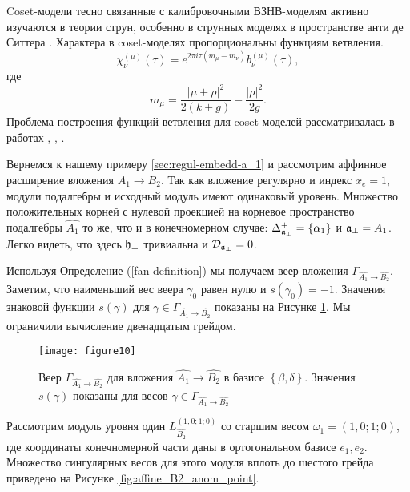 Coset-модели \cite{Goddard198588} тесно связанные с калибровочными ВЗНВ-моделям активно изучаются в теории струн, особенно в струнных моделях в пространстве анти де Ситтера
\cite{Maldacena:2000hw,Maldacena:2000kv,Maldacena:2001km,Maldacena:2001ky,Aharony:1999ti}. Характера в coset-моделях пропорциональны функциям ветвления.
\begin{equation}
  \label{eq:31}
  \chi^{(\mu)}_{\nu}(\tau)=e^{2\pi i \tau (m_{\mu}-m_{\nu})} b^{(\mu)}_{\nu}(\tau),
\end{equation}
где
\begin{equation*}
  \label{eq:46}
  m_{\mu}=\frac{\left|\mu+\rho\right|^2}{2(k+g)}-\frac{\left|\rho\right|^2}{2g}.
\end{equation*}
Проблема построения функций ветвления для  coset-моделей рассматривалась в работах  \cite{Dunbar:1992gh}, \cite{Hwang:1994yr}, \cite{lu1994branching}.

Вернемся к нашему примеру \ref{sec:regul-embedd-a_1} и рассмотрим аффинное расширение вложения $A_1 \rightarrow B_2$. Так как вложение регулярно и индекс $x_e=1$, модули подалгебры и исходный модуль имеют одинаковый уровень. Множество положительных корней с нулевой проекцией на корневое пространство подалгебры  $\hat{A_1}$ то же, что и в конечномерном случае: $\Delta^{+}_{\mathfrak{a}_{\perp}}=\left\{ \alpha_1 \right\}$ и $\mathfrak{a}_{\perp}=A_1$. Легко видеть, что здесь $\mathfrak{h}_{\perp}$ тривиальна и  ${\cal D}_{\mathfrak{a}_{\perp}}=0$.

Используя Определение (\ref{fan-definition}) мы получаем веер вложения $\Gamma_{\hat{A_1} \longrightarrow  \hat{B_2} }$. Заметим, что наименьший вес веера $\gamma_0$ равен нулю и  $s\left( \gamma_0 \right)=-1$. Значения знаковой функции  $s(\gamma)$ для $ \gamma \in \Gamma_{\hat{A_1} \longrightarrow  \hat{B_2} }$ показаны на Рисунке \ref{fig:AffineB2A1Fan}.
Мы ограничили вычисление двенадцатым грейдом. 
\begin{figure}[h!bt]
  \centering
  \texttt{[image: figure10]}
  \caption{Веер $\Gamma_{\hat{A_1}\rightarrow \hat{B_2}}$ для вложения $\hat{A_1}\rightarrow \hat{B_2}$ в базисе $\left\{\beta,\delta \right\}$. Значения $s(\gamma)$ показаны для весов $\gamma\in \Gamma_{\hat{A_1}\rightarrow \hat{B_2}}$}
  \label{fig:AffineB2A1Fan}
\end{figure}

Рассмотрим модуль уровня один $L^{\left( 1,0;1;0 \right)}_{\hat{B_2}}$  со старшим весом  $\omega_1=(1,0;1;0)$, где координаты конечномерной части даны в ортогональном базисе $e_1,e_2$. Множество сингулярных весов для этого модуля вплоть до шестого грейда приведено на Рисунке \ref{fig:affine_B2_anom_point}.


